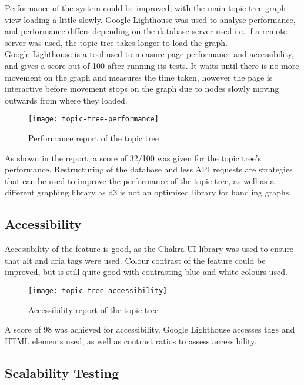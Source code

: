 Performance of the system could be improved, with the main topic tree graph view loading a little slowly. Google Lighthouse was used to analyse performance, and performance differs depending on the database server used i.e. if a remote server was used, the topic tree takes longer to load the graph.\\

Google Lighthouse is a tool used to measure page performance and accessibility, and gives a score out of 100 after running its tests. It waits until there is no more movement on the graph and measures the time taken, however the page is interactive before movement stops on the graph due to nodes slowly moving outwards from where they loaded.\\


\begin{figure}[h!]
    \centering
    \texttt{[image: topic-tree-performance]}
    \caption{Performance report of the topic tree}
\end{figure}

As shown in the report, a score of 32/100 was given for the topic tree's performance. Restructuring of the database and less API requests are strategies that can be used to improve the performance of the topic tree, as well as a different graphing library as d3 is not an optimised library for handling graphs.\\

\subsection{Accessibility}
Accessibility of the feature is good, as the Chakra UI library was used to ensure that alt and aria tags were used. Colour contrast of the feature could be improved, but is still quite good with contrasting blue and white colours used. \\

\begin{figure}[h!]
    \centering
    \texttt{[image: topic-tree-accessibility]}
    \caption{Accessibility report of the topic tree}
\end{figure}

A score of 98 was achieved for accessibility. Google Lighthouse accesses tags and HTML elements used, as well as contrast ratios to assess accessibility.\\

\subsection{Scalability Testing}

